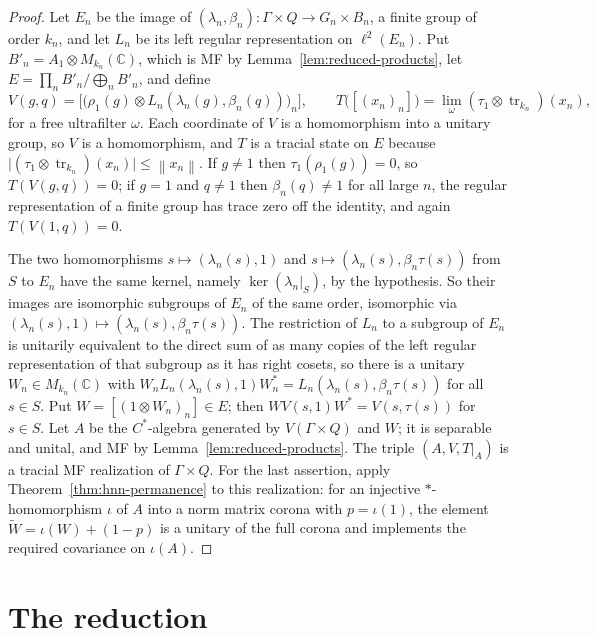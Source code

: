 \documentclass[11pt]{amsart}
\theoremstyle{remark}
\theoremstyle{plain}
\newcommand{\C}{\mathbb C}
\newcommand{\opnorm}[1]{\left\lVert #1\right\rVert}
\begin{document}
\begin{proof}
Let $E_n$ be the image of $(\lambda_n,\beta_n)\colon\Gamma\times Q\to G_n\times B_n$,
a finite group of order $k_n$, and let $L_n$ be its left regular
representation on $\ell^2(E_n)$.  Put $B'_n=A_1\otimes M_{k_n}(\C)$,
which is MF by Lemma~\ref{lem:reduced-products}, let
$E=\prod_nB'_n/\bigoplus_nB'_n$, and define
\[
 V(g,q)=\bigl[\bigl(\rho_1(g)\otimes L_n(\lambda_n(g),\beta_n(q))\bigr)_n\bigr],
 \qquad
 T\bigl([(x_n)_n]\bigr)=\lim_\omega(\tau_1\otimes\operatorname{tr}_{k_n})(x_n),
\]
for a free ultrafilter $\omega$.  Each coordinate of $V$ is a homomorphism
into a unitary group, so $V$ is a homomorphism, and $T$ is a tracial state
on $E$ because $\lvert(\tau_1\otimes\operatorname{tr}_{k_n})(x_n)\rvert\le\opnorm{x_n}$.
If $g\ne1$ then $\tau_1(\rho_1(g))=0$, so $T(V(g,q))=0$; if $g=1$ and
$q\ne1$ then $\beta_n(q)\ne1$ for all large $n$, the regular
representation of a finite group has trace zero off the identity, and
again $T(V(1,q))=0$.

The two homomorphisms $s\mapsto(\lambda_n(s),1)$ and
$s\mapsto(\lambda_n(s),\beta_n\tau(s))$ from $S$ to $E_n$ have the same
kernel, namely $\ker(\lambda_n|_S)$, by the hypothesis.  So their images are
isomorphic subgroups of $E_n$ of the same order, isomorphic via
$(\lambda_n(s),1)\mapsto(\lambda_n(s),\beta_n\tau(s))$.  The restriction
of $L_n$ to a subgroup of $E_n$ is unitarily equivalent to the direct sum
of as many copies of the left regular representation of that subgroup as
it has right cosets, so there is a unitary $W_n\in M_{k_n}(\C)$ with
$W_nL_n(\lambda_n(s),1)W_n^*=L_n(\lambda_n(s),\beta_n\tau(s))$ for all
$s\in S$.  Put $W=[(1\otimes W_n)_n]\in E$; then $WV(s,1)W^*=V(s,\tau(s))$
for $s\in S$.  Let $A$ be the $C^*$-algebra generated by $V(\Gamma\times Q)$
and $W$; it is separable and unital, and MF by
Lemma~\ref{lem:reduced-products}.  The triple $(A,V,T|_A)$ is a tracial
MF realization of $\Gamma\times Q$.  For the last assertion, apply
Theorem~\ref{thm:hnn-permanence} to this realization: for an injective
$*$-homomorphism $\iota$ of $A$ into a norm matrix corona with
$p=\iota(1)$, the element $\widetilde W=\iota(W)+(1-p)$ is a unitary of the
full corona and implements the required covariance on $\iota(A)$.
\end{proof}

\section{The reduction}\label{sec:compiler}
\end{document}
